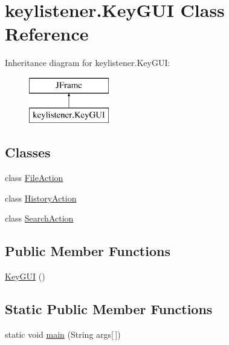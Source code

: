\hypertarget{classkeylistener_1_1_key_g_u_i}{}\section{keylistener.\+Key\+G\+UI Class Reference}
\label{classkeylistener_1_1_key_g_u_i}
Inheritance diagram for keylistener.\+Key\+G\+UI\+:\begin{figure}[H]
\begin{center}
\leavevmode
\includegraphics[height=2.000000cm]{classkeylistener_1_1_key_g_u_i}
\end{center}
\end{figure}
\subsection*{Classes}
\begin{DoxyCompactItemize}
\item 
class \hyperlink{classkeylistener_1_1_key_g_u_i_1_1_file_action}{File\+Action}
\item 
class \hyperlink{classkeylistener_1_1_key_g_u_i_1_1_history_action}{History\+Action}
\item 
class \hyperlink{classkeylistener_1_1_key_g_u_i_1_1_search_action}{Search\+Action}
\end{DoxyCompactItemize}
\subsection*{Public Member Functions}
\begin{DoxyCompactItemize}
\item 
\hyperlink{classkeylistener_1_1_key_g_u_i_af48eff8474974c6c21eb0c36feaf65ad}{Key\+G\+UI} ()
\end{DoxyCompactItemize}
\subsection*{Static Public Member Functions}
\begin{DoxyCompactItemize}
\item 
static void \hyperlink{classkeylistener_1_1_key_g_u_i_ac0043858e116673e920af7f1542f5376}{main} (String args\mbox{[}$\,$\mbox{]})
\end{DoxyCompactItemize}
